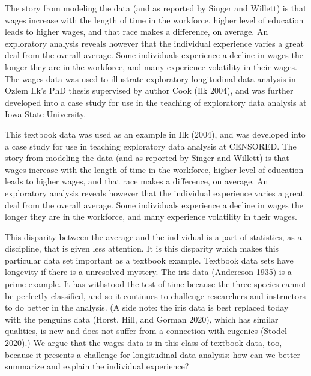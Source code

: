 \documentclass{article}
\begin{document}
The story from modeling the data (and as reported by Singer and Willett) is that wages increase with the length of time in the workforce, higher level of education leads to higher wages, and that race makes a difference, on average. An exploratory analysis reveals however that the individual experience varies a great deal from the overall average. Some individuals experience a decline in wages the longer they are in the workforce, and many experience volatility in their wages. The wages data was used to illustrate exploratory longitudinal data analysis in Ozlem Ilk's PhD thesis supervised by author Cook (Ilk 2004), and was further developed into a case study for use in the teaching of exploratory data analysis at Iowa State University.

This textbook data was used as an example in Ilk (2004), and was developed into a case study for use in teaching exploratory data analysis at CENSORED. The story from modeling the data (and as reported by Singer and Willett) is that wages increase with the length of time in the workforce, higher level of education leads to higher wages, and that race makes a difference, on average. An exploratory analysis reveals however that the individual experience varies a great deal from the overall average. Some individuals experience a decline in wages the longer they are in the workforce, and many experience volatility in their wages.

This disparity between the average and the individual is a part of statistics, as a discipline, that is given less attention. It is this disparity which makes this particular data set important as a textbook example. Textbook data sets have longevity if there is a unresolved mystery. The iris data (Andereson 1935) is a prime example. It has withstood the test of time because the three species cannot be perfectly classified, and so it continues to challenge researchers and instructors to do better in the analysis. (A side note: the iris data is best replaced today with the penguins data (Horst, Hill, and Gorman 2020), which has similar qualities, is new and does not suffer from a connection with eugenics (Stodel 2020).) We argue that the wages data is in this class of textbook data, too, because it presents a challenge for longitudinal data analysis: how can we better summarize and explain the individual experience?
\end{document}
